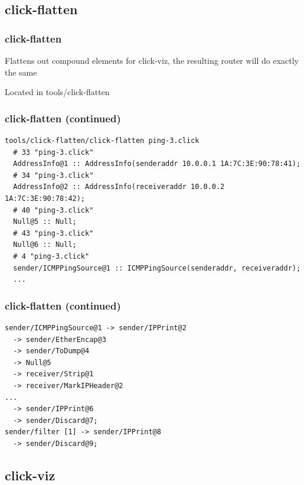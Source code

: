 \documentclass{beamer}
\begin{document}
\subsection{click-flatten} %
\label{sub:click_flatten}

\begin{frame}[fragile]
\frametitle{click-flatten}
Flattens out compound elements for click-viz, the resulting router will do exactly the same

Located in tools/click-flatten
\end{frame}

\begin{frame}[fragile]
\frametitle{click-flatten (continued)}
\begin{lstlisting}[basicstyle=\footnotesize]
  tools/click-flatten/click-flatten ping-3.click
  # 33 "ping-3.click"
  AddressInfo@1 :: AddressInfo(senderaddr 10.0.0.1 1A:7C:3E:90:78:41);
  # 34 "ping-3.click"
  AddressInfo@2 :: AddressInfo(receiveraddr 10.0.0.2 1A:7C:3E:90:78:42);
  # 40 "ping-3.click"
  Null@5 :: Null;
  # 43 "ping-3.click"
  Null@6 :: Null;
  # 4 "ping-3.click"
  sender/ICMPPingSource@1 :: ICMPPingSource(senderaddr, receiveraddr);
  ...
\end{lstlisting}
\end{frame}

\begin{frame}[fragile]
\frametitle{click-flatten (continued)}
\begin{lstlisting}
sender/ICMPPingSource@1 -> sender/IPPrint@2
  -> sender/EtherEncap@3
  -> sender/ToDump@4
  -> Null@5
  -> receiver/Strip@1
  -> receiver/MarkIPHeader@2
...
  -> sender/IPPrint@6
  -> sender/Discard@7;
sender/filter [1] -> sender/IPPrint@8
  -> sender/Discard@9;
\end{lstlisting}
\end{frame}
\subsection{click-viz} %
\label{sub:click_viz}
\end{document}
